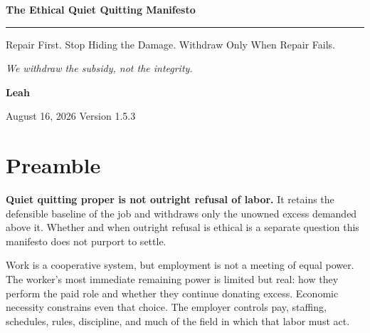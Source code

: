 \documentclass[11pt,oneside]{article}
\begin{document}
\hypersetup{pageanchor=false}

\begin{titlepage}
\thispagestyle{empty}
\vspace*{0.9in}

{\sffamily\bfseries\fontsize{31}{36}\selectfont\color{ManifestInk}
The Ethical Quiet Quitting Manifesto\par}

\vspace{0.5em}
{\color{ManifestRule}\rule{\textwidth}{1.2pt}}
\vspace{1.0em}

{\sffamily\fontsize{17}{23}\selectfont\color{ManifestGray}
Repair First. Stop Hiding the Damage. Withdraw Only When Repair
Fails.\par}

\vfill

\begin{tcolorbox}[
  enhanced,
  colback=ManifestLight,
  colframe=ManifestRule,
  boxrule=0pt,
  leftrule=4pt,
  arc=0pt,
  left=14pt,right=14pt,top=13pt,bottom=13pt
]
{\Large\itshape We withdraw the subsidy, not the integrity.}
\end{tcolorbox}
\vfill

{\sffamily\large\bfseries Leah\par}
\vspace{0.2em}
{\sffamily\color{ManifestGray}August 16, 2026 \quad Version 1.5.3\par}
\vspace{0.55in}
\end{titlepage}

\thispagestyle{plain}
\tableofcontents
\clearpage
{}
\hypersetup{pageanchor=true}

\hypertarget{preamble}{%
\section{Preamble}\label{preamble}}

\textbf{Quiet quitting proper is not outright refusal of labor.} It
retains the defensible baseline of the job and withdraws only the
unowned excess demanded above it. Whether and when outright refusal is
ethical is a separate question this manifesto does not purport to
settle.

Work is a cooperative system, but employment is not a meeting of equal
power. The worker's most immediate remaining power is limited but real:
how they perform the paid role and whether they continue donating
excess. Economic necessity constrains even that choice. The employer
controls pay, staffing, schedules, rules, discipline, and much of the
field in which that labor must act.
\end{document}

